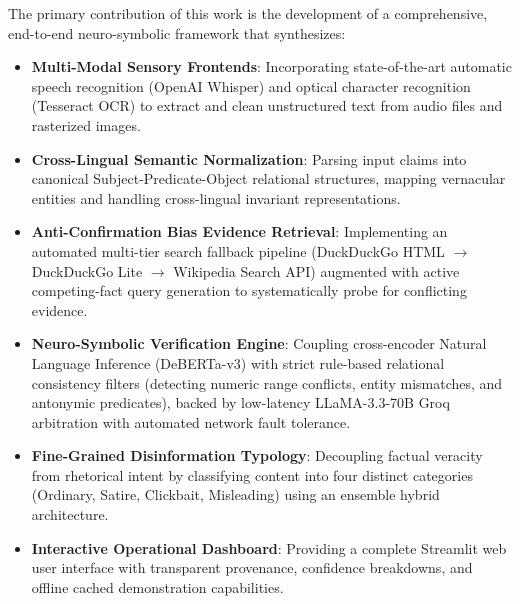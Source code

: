 \documentclass[12pt,a4paper]{report}
\begin{document}
The primary contribution of this work is the development of a comprehensive, end-to-end neuro-symbolic framework that synthesizes:
\begin{itemize}
    \item \textbf{Multi-Modal Sensory Frontends}: Incorporating state-of-the-art automatic speech recognition (OpenAI Whisper) and optical character recognition (Tesseract OCR) to extract and clean unstructured text from audio files and rasterized images.
    \item \textbf{Cross-Lingual Semantic Normalization}: Parsing input claims into canonical Subject-Predicate-Object relational structures, mapping vernacular entities and handling cross-lingual invariant representations.
    \item \textbf{Anti-Confirmation Bias Evidence Retrieval}: Implementing an automated multi-tier search fallback pipeline (DuckDuckGo HTML $\to$ DuckDuckGo Lite $\to$ Wikipedia Search API) augmented with active competing-fact query generation to systematically probe for conflicting evidence.
    \item \textbf{Neuro-Symbolic Verification Engine}: Coupling cross-encoder Natural Language Inference (DeBERTa-v3) with strict rule-based relational consistency filters (detecting numeric range conflicts, entity mismatches, and antonymic predicates), backed by low-latency LLaMA-3.3-70B Groq arbitration with automated network fault tolerance.
    \item \textbf{Fine-Grained Disinformation Typology}: Decoupling factual veracity from rhetorical intent by classifying content into four distinct categories (Ordinary, Satire, Clickbait, Misleading) using an ensemble hybrid architecture.
    \item \textbf{Interactive Operational Dashboard}: Providing a complete Streamlit web user interface with transparent provenance, confidence breakdowns, and offline cached demonstration capabilities.
\end{itemize}
\end{document}
